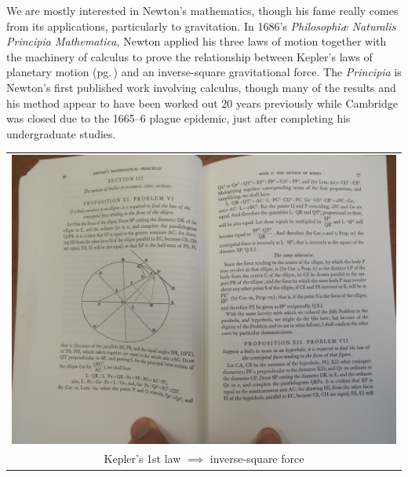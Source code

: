 \begin{minipage}[t]{0.53\linewidth}\vspace{-4pt}
We are mostly interested in Newton's mathematics, though his fame really comes from its applications, particularly to gravitation. In 1686's \emph{Philosophiæ Naturalis Principia Mathematica,} Newton applied his three laws of motion\footnotemark{} together with the machinery of calculus to prove the relationship between Kepler's laws of planetary motion (pg.\,\pageref{pg:keplerslaws}) and an inverse-square gravitational force. The \emph{Principia} is Newton's first published work involving calculus, though many of the results and his method appear to have been worked out 20 years previously while Cambridge was closed due to the 1665--6 plague epidemic, just after completing his undergraduate studies.
\end{minipage}\hfill
\begin{minipage}[t]{0.44\linewidth}\vspace{-5pt}
	\flushright
	\begin{tabular}{@{}c@{}}
	\includegraphics[width=\textwidth]{newton5.jpg}\\
	Kepler's 1st law $\implies$ inverse-square force
	\end{tabular}
\end{minipage}\smallbreak

 
